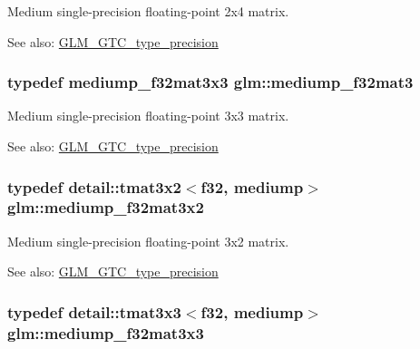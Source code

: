 Medium single-precision floating-point 2x4 matrix. \begin{Desc}
\item[See also:]\hyperlink{group__gtc__type__precision}{GLM\_\-GTC\_\-type\_\-precision} \end{Desc}
\hypertarget{group__gtc__type__precision_ge263a08ef179894fdd36f9a51698c4ab}{
\subsubsection[mediump\_\-f32mat3]{\setlength{\rightskip}{0pt plus 5cm}typedef mediump\_\-f32mat3x3 {\bf glm::mediump\_\-f32mat3}}}
\label{group__gtc__type__precision_ge263a08ef179894fdd36f9a51698c4ab}


Medium single-precision floating-point 3x3 matrix. \begin{Desc}
\item[See also:]\hyperlink{group__gtc__type__precision}{GLM\_\-GTC\_\-type\_\-precision} \end{Desc}
\hypertarget{group__gtc__type__precision_g9762d48bb9b41e3cf40f6e616cf61b6b}{
\subsubsection[mediump\_\-f32mat3x2]{\setlength{\rightskip}{0pt plus 5cm}typedef detail::tmat3x2$<$f32, mediump$>$ {\bf glm::mediump\_\-f32mat3x2}}}
\label{group__gtc__type__precision_g9762d48bb9b41e3cf40f6e616cf61b6b}


Medium single-precision floating-point 3x2 matrix. \begin{Desc}
\item[See also:]\hyperlink{group__gtc__type__precision}{GLM\_\-GTC\_\-type\_\-precision} \end{Desc}
\hypertarget{group__gtc__type__precision_gd4d01189a1462366b143c5cbc3de0ea9}{
\subsubsection[mediump\_\-f32mat3x3]{\setlength{\rightskip}{0pt plus 5cm}typedef detail::tmat3x3$<$f32, mediump$>$ {\bf glm::mediump\_\-f32mat3x3}}}
\label{group__gtc__type__precision_gd4d01189a1462366b143c5cbc3de0ea9}


